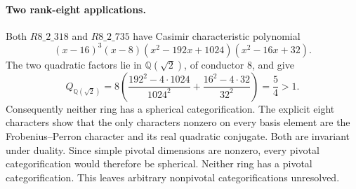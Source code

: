 \paragraph{Two rank-eight applications.}
Both $R8\_2\_318$ and $R8\_2\_735$ have Casimir characteristic polynomial
\[
 (x-16)^3(x-8)(x^2-192x+1024)(x^2-16x+32).
\]
The two quadratic factors lie in $\mathbb Q(\sqrt2)$, of conductor $8$,
and give
\[
 Q_{\mathbb Q(\sqrt2)}
 =8\left(\frac{192^2-4\cdot1024}{1024^2}
          +\frac{16^2-4\cdot32}{32^2}\right)=\frac54>1.
\]
Consequently neither ring has a spherical categorification.  The explicit
eight characters show that the only characters nonzero on every basis
element are the Frobenius--Perron character and its real quadratic
conjugate.  Both are invariant under duality.  Since simple pivotal
dimensions are nonzero, every pivotal categorification would therefore
be spherical.  Neither ring has a pivotal categorification.
This leaves arbitrary nonpivotal categorifications unresolved.
